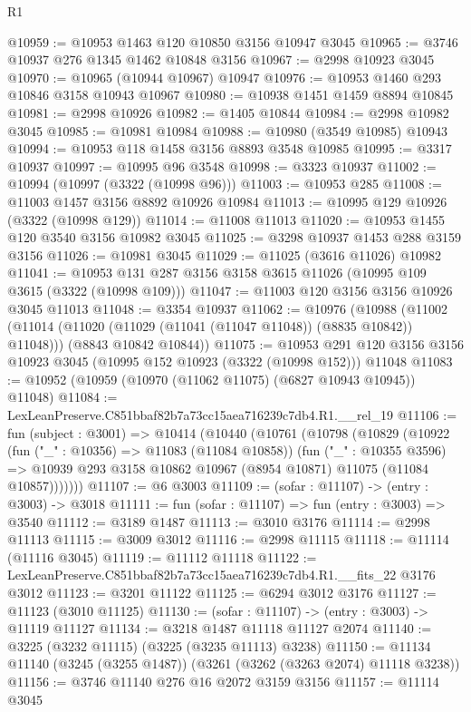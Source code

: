 \begin{lexlean}{R1}
\begin{coremodule}
@10959 := @10953 @1463 @120 @10850 @3156 @10947 @3045
@10965 := @3746 @10937 @276 @1345 @1462 @10848 @3156
@10967 := @2998 @10923 @3045
@10970 := @10965 (@10944 @10967) @10947
@10976 := @10953 @1460 @293 @10846 @3158 @10943 @10967
@10980 := @10938 @1451 @1459 @8894 @10845
@10981 := @2998 @10926
@10982 := @1405 @10844
@10984 := @2998 @10982 @3045
@10985 := @10981 @10984
@10988 := @10980 (@3549 @10985) @10943
@10994 := @10953 @118 @1458 @3156 @8893 @3548 @10985
@10995 := @3317 @10937
@10997 := @10995 @96 @3548
@10998 := @3323 @10937
@11002 := @10994 (@10997 (@3322 (@10998 @96)))
@11003 := @10953 @285
@11008 := @11003 @1457 @3156 @8892 @10926 @10984
@11013 := @10995 @129 @10926 (@3322 (@10998 @129))
@11014 := @11008 @11013
@11020 := @10953 @1455 @120 @3540 @3156 @10982 @3045
@11025 := @3298 @10937 @1453 @288 @3159 @3156
@11026 := @10981 @3045
@11029 := @11025 (@3616 @11026) @10982
@11041 := @10953 @131 @287 @3156 @3158 @3615 @11026 (@10995 @109 @3615 (@3322 (@10998 @109)))
@11047 := @11003 @120 @3156 @3156 @10926 @3045 @11013
@11048 := @3354 @10937
@11062 := @10976
    (@10988
      (@11002 (@11014 (@11020 (@11029 (@11041 (@11047 @11048)) (@8835 @10842)) @11048)))
      (@8843 @10842 @10844))
@11075 := @10953
    @291
    @120
    @3156
    @3156
    @10923
    @3045
    (@10995 @152 @10923 (@3322 (@10998 @152)))
    @11048
@11083 := @10952 (@10959 (@10970 (@11062 @11075) (@6827 @10943 @10945)) @11048)
@11084 := LexLeanPreserve.C851bbaf82b7a73cc15aea716239c7db4.R1.__rel_19
@11106 := fun (subject : @3001) =>
  @10414
    (@10440
      (@10761
        (@10798
          (@10829
            (@10922
              (fun ("_" : @10356) => @11083 (@11084 @10858))
              (fun ("_" : @10355 @3596) =>
              @10939 @293 @3158 @10862 @10967 (@8954 @10871) @11075 (@11084 @10857)))))))
@11107 := @6 @3003
@11109 := (sofar : @11107) -> (entry : @3003) -> @3018
@11111 := fun (sofar : @11107) => fun (entry : @3003) => @3540
@11112 := @3189 @1487
@11113 := @3010 @3176
@11114 := @2998 @11113
@11115 := @3009 @3012
@11116 := @2998 @11115
@11118 := @11114 (@11116 @3045)
@11119 := @11112 @11118
@11122 := LexLeanPreserve.C851bbaf82b7a73cc15aea716239c7db4.R1.__fits_22 @3176 @3012
@11123 := @3201 @11122
@11125 := @6294 @3012 @3176
@11127 := @11123 (@3010 @11125)
@11130 := (sofar : @11107) -> (entry : @3003) -> @11119 @11127
@11134 := @3218 @1487 @11118 @11127 @2074
@11140 := @3225 (@3232 @11115) (@3225 (@3235 @11113) @3238)
@11150 := @11134 @11140 (@3245 (@3255 @1487)) (@3261 (@3262 (@3263 @2074) @11118 @3238))
@11156 := @3746 @11140 @276 @16 @2072 @3159 @3156
@11157 := @11114 @3045

\end{coremodule}
\end{lexlean}
